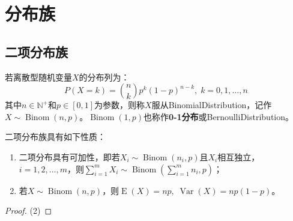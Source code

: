 \section{分布族}

\subsection{二项分布族}
\begin{definition}
	若离散型随机变量$X$的分布列为：
	\begin{equation*}
		P(X=k)=\binom{n}{k}p^k(1-p)^{n-k},\;k=0,1,\dots,n
	\end{equation*}
	其中$n\in\mathbb{N}^+$和$p\in[0,1]$为参数，则称$X$服从\gls{BinomialDistribution}，记作$X\sim\operatorname{Binom}(n,p)$。$\operatorname{Binom}(1,p)$也称作\textbf{0-1分布}或\gls{BernoulliDistribution}。
\end{definition}
\begin{property}\label{prop:Binom}
	二项分布族具有如下性质：
	\begin{enumerate}
		\item 二项分布具有可加性，即若$X_i\sim\operatorname{Binom}(n_i,p)$且$X_i$相互独立，$i=1,2,\dots,m$，则$\sum\limits_{i=1}^{m}X_i\sim\operatorname{Binom}\left(\sum\limits_{i=1}^{m}n_i,p\right)$；
		\item 若$X\sim\operatorname{Binom}(n,p)$，则$\operatorname{E}(X)=np,\;\operatorname{Var}(X)=np(1-p)$。
	\end{enumerate}
\end{property}
\begin{proof}
	(2)
\end{proof}

